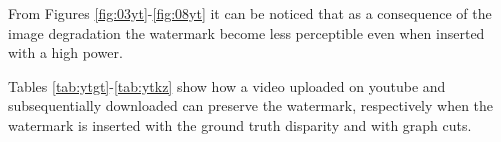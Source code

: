 From Figures \ref{fig:03yt}-\ref{fig:08yt} it can be noticed that as a consequence of the image degradation the watermark become less perceptible even when inserted with a high power. 

Tables \ref{tab:ytgt}-\ref{tab:ytkz} show how a video uploaded on youtube and subsequentially downloaded can preserve the watermark, respectively when the watermark is inserted with the ground truth disparity and with graph cuts.\newline
 
\begin{table}[h!]
\begin{center}
\caption{Detection statistic for a downloaded video marked with ground truth disparity.\label{tab:ytgt}}
\end{center}
\end{table}
 
 
\begin{table}[h!]
\begin{center}
\caption{Detection statistic for a downloaded video marked with graph cuts disparity.\label{tab:ytkz}}
\end{center}
\end{table}
 

 
